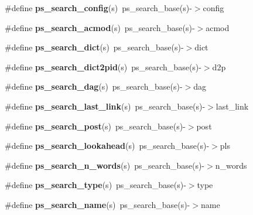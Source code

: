 \begin{DoxyCompactItemize}
\item 
\#define {\bfseries ps\+\_\+search\+\_\+config}(s)~ps\+\_\+search\+\_\+base(s)-\/$>$config\label{pocketsphinx__internal_8h_a856f984d97ce3d4ac640f1a9061065cf}

\item 
\#define {\bfseries ps\+\_\+search\+\_\+acmod}(s)~ps\+\_\+search\+\_\+base(s)-\/$>$acmod\label{pocketsphinx__internal_8h_a03b1edeb67c83451296c2d99b22621a9}

\item 
\#define {\bfseries ps\+\_\+search\+\_\+dict}(s)~ps\+\_\+search\+\_\+base(s)-\/$>$dict\label{pocketsphinx__internal_8h_ae2aad02cace01fbb2f345a0ead69c672}

\item 
\#define {\bfseries ps\+\_\+search\+\_\+dict2pid}(s)~ps\+\_\+search\+\_\+base(s)-\/$>$d2p\label{pocketsphinx__internal_8h_a5c91d7c3f11ba5b938705d1fe65676f9}

\item 
\#define {\bfseries ps\+\_\+search\+\_\+dag}(s)~ps\+\_\+search\+\_\+base(s)-\/$>$dag\label{pocketsphinx__internal_8h_a90e5addd9875c355d99208246802f7d8}

\item 
\#define {\bfseries ps\+\_\+search\+\_\+last\+\_\+link}(s)~ps\+\_\+search\+\_\+base(s)-\/$>$last\+\_\+link\label{pocketsphinx__internal_8h_a9ae7d942e4206b4184cc073a87d2dc82}

\item 
\#define {\bfseries ps\+\_\+search\+\_\+post}(s)~ps\+\_\+search\+\_\+base(s)-\/$>$post\label{pocketsphinx__internal_8h_ac8707bfd426dfd0eceb1e57836c0ac91}

\item 
\#define {\bfseries ps\+\_\+search\+\_\+lookahead}(s)~ps\+\_\+search\+\_\+base(s)-\/$>$pls\label{pocketsphinx__internal_8h_a890584ac65d28cd404d66adf631fac7c}

\item 
\#define {\bfseries ps\+\_\+search\+\_\+n\+\_\+words}(s)~ps\+\_\+search\+\_\+base(s)-\/$>$n\+\_\+words\label{pocketsphinx__internal_8h_aaba5c849ae487b5a3fff0210f4687e25}

\item 
\#define {\bfseries ps\+\_\+search\+\_\+type}(s)~ps\+\_\+search\+\_\+base(s)-\/$>$type\label{pocketsphinx__internal_8h_a0dddf728c44bd7f9e58bdacab032e9eb}

\item 
\#define {\bfseries ps\+\_\+search\+\_\+name}(s)~ps\+\_\+search\+\_\+base(s)-\/$>$name\label{pocketsphinx__internal_8h_a6ff1216eb4c0053ecdfe6096d79f02f7}


\end{DoxyCompactItemize}

